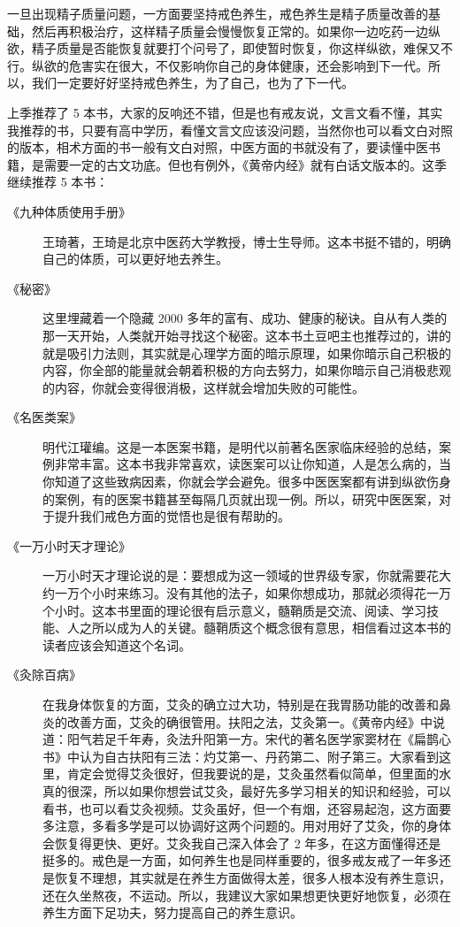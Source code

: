 \documentclass[fontset=founder]{ctexart}
\begin{document}
一旦出现精子质量问题，一方面要坚持戒色养生，戒色养生是精子质量改善的基础，然后再积极治疗，这样精子质量会慢慢恢复正常的。如果你一边吃药一边纵欲，精子质量是否能恢复就要打个问号了，即使暂时恢复，你这样纵欲，难保又不行。纵欲的危害实在很大，不仅影响你自己的身体健康，还会影响到下一代。所以，我们一定要好好坚持戒色养生，为了自己，也为了下一代。

上季推荐了 5 本书，大家的反响还不错，但是也有戒友说，文言文看不懂，其实我推荐的书，只要有高中学历，看懂文言文应该没问题，当然你也可以看文白对照的版本，相术方面的书一般有文白对照，中医方面的书就没有了，要读懂中医书籍，是需要一定的古文功底。但也有例外，《黄帝内经》就有白话文版本的。这季继续推荐 5 本书：

\begin{description}
    \item[《九种体质使用手册》] 王琦著，王琦是北京中医药大学教授，博士生导师。这本书挺不错的，明确自己的体质，可以更好地去养生。
    \item[《秘密》] 这里埋藏着一个隐藏 2000 多年的富有、成功、健康的秘诀。自从有人类的那一天开始，人类就开始寻找这个秘密。这本书土豆吧主也推荐过的，讲的就是吸引力法则，其实就是心理学方面的暗示原理，如果你暗示自己积极的内容，你全部的能量就会朝着积极的方向去努力，如果你暗示自己消极悲观的内容，你就会变得很消极，这样就会增加失败的可能性。
    \item[《名医类案》] 明代江瓘编。这是一本医案书籍，是明代以前著名医家临床经验的总结，案例非常丰富。这本书我非常喜欢，读医案可以让你知道，人是怎么病的，当你知道了这些致病因素，你就会学会避免。很多中医医案都有讲到纵欲伤身的案例，有的医案书籍甚至每隔几页就出现一例。所以，研究中医医案，对于提升我们戒色方面的觉悟也是很有帮助的。
    \item[《一万小时天才理论》] 一万小时天才理论说的是：要想成为这一领域的世界级专家，你就需要花大约一万个小时来练习。没有其他的法子，如果你想成功，那就必须得花一万个小时。这本书里面的理论很有启示意义，髓鞘质是交流、阅读、学习技能、人之所以成为人的关键。髓鞘质这个概念很有意思，相信看过这本书的读者应该会知道这个名词。
    \item[《灸除百病》] 在我身体恢复的方面，艾灸的确立过大功，特别是在我胃肠功能的改善和鼻炎的改善方面，艾灸的确很管用。扶阳之法，艾灸第一。《黄帝内经》中说道：阳气若足千年寿，灸法升阳第一方。宋代的著名医学家窦材在《扁鹊心书》中认为自古扶阳有三法：灼艾第一、丹药第二、附子第三。大家看到这里，肯定会觉得艾灸很好，但我要说的是，艾灸虽然看似简单，但里面的水真的很深，所以如果你想尝试艾灸，最好先多学习相关的知识和经验，可以看书，也可以看艾灸视频。艾灸虽好，但一个有烟，还容易起泡，这方面要多注意，多看多学是可以协调好这两个问题的。用对用好了艾灸，你的身体会恢复得更快、更好。艾灸我自己深入体会了 2 年多，在这方面懂得还是挺多的。戒色是一方面，如何养生也是同样重要的，很多戒友戒了一年多还是恢复不理想，其实就是在养生方面做得太差，很多人根本没有养生意识，还在久坐熬夜，不运动。所以，我建议大家如果想更快更好地恢复，必须在养生方面下足功夫，努力提高自己的养生意识。
\end{description}
\end{document}
